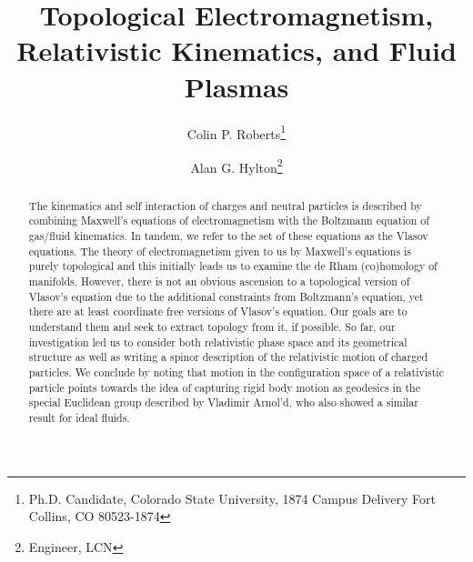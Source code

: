 \documentclass{article}
\title{Topological Electromagnetism, Relativistic Kinematics, and Fluid Plasmas}
\author{Colin P. Roberts\footnote{Ph.D. Candidate, Colorado State University, 1874 Campus Delivery Fort Collins, CO 80523-1874}}
\affil{Colorado State University, Fort Collins, Colorado, 80523}
\author{Alan G. Hylton\footnote{Engineer, LCN}}
\affil{NASA Glenn Research Center, Cleveland, Ohio, 44135, USA}
\begin{document}
\maketitle

\begin{abstract}
The kinematics and self interaction of charges and neutral particles is described by combining Maxwell's equations of electromagnetism with the Boltzmann equation of gas/fluid kinematics. In tandem, we refer to the set of these equations as the Vlasov equations. The theory of electromagnetism given to us by Maxwell's equations is purely topological and this initially leads us to examine the de Rham (co)homology of manifolds. However, there is not an obvious ascension to a topological version of Vlasov's equation due to the additional constraints from Boltzmann's equation, yet there are at least coordinate free versions of Vlasov's equation. Our goals are to understand them and seek to extract topology from it, if possible. So far, our investigation led us to consider both relativistic phase space and its geometrical structure as well as writing a spinor description of the relativistic motion of charged particles. We conclude by noting that motion in the configuration space of a relativistic particle points towards the idea of capturing rigid body motion as geodesics in the special Euclidean group described by Vladimir Arnol'd, who also showed a similar result for ideal fluids.
\end{abstract}

%
\end{document}
